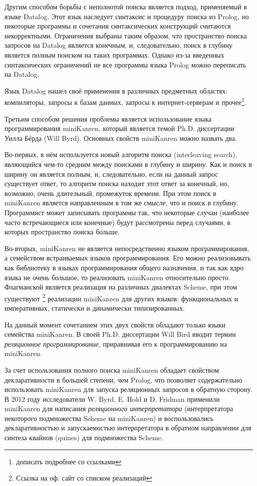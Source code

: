 Другим способом борьбы с неполнотой поиска является подход, применяемый в языке Datalog. Этот язык наследует синтаксис и процедуру поиска из Prolog, но некоторые программы и сочетания синтаксических конструкций считаются некорректными. Ограничения выбраны таким образом, что пространство поиска запросов на Datalog является конечным, и, следовательно, поиск в глубину является полным поиском на таких программах. Однако из-за введенных синтаксических ограничений не все программы языка Prolog можно переписать на Datalog.

Язык Datalog нашел своё применения в различных предметных областях: компиляторы, запросы к базам данных, запросы к интернет-серверам и прочее\footnote{дописать подробнее со ссылками}.

Третьим способом решения проблемы является использование языка программирования miniKanren, который является темой Ph.D. диссертации Уилла Бёрда (Will Byrd). Основных свойств miniKanren можно назвать два.

Во-первых, в нём используется новый алгоритм поиска (interleaving search), являющийся чем-то средним между поисками в глубину и ширину. Как и поиск в ширину он является полным, и, следовательно, если на данный запрос существует ответ, то алгоритм поиска находит этот ответ за конечный, но, возможно, очень длительный, промежуток времени. При этом поиск в miniKanren является направленным в том же смысле, что и поиск в глубину. Программист может записывать программы так, что некоторые случаи (наиболее часто встречающиеся или конечные) будут рассмотрены перед случаями, в которых пространство поиска больше.

Во-вторых, miniKanren не является непосредственно языком программирования, а семейством встраиваемых языков программирования. Его можно реализовывать как библиотеку в языках программирования общего назначения, и так как ядро языка не очень большое, то реализовать miniKanren относительно просто. Флагманской является реализация на различных диалектах Scheme, при этом существуют \footnote{Ссылка на оф. сайт со списком реализаций} реализации miniKanren для других языков: функциональных и императивных, статически и динамически типизированных.

На данный момент сочетанием этих двух свойств обладают только языки семейства miniKanren. В своей Ph.D. диссертации Will Bird вводит термин \emph{реляционное программирование}, приравнивая его к программированию на miniKanren.

За счет использования полного поиска miniKanren обладает свойством декларативности в большей степени, чем Prolog, что позволяет содержательно использовать miniKanren для запуска реляционных запросов в обратную сторону. В 2012 году исследователи W. Byrd, E. Hold и D. Fridman применили miniKanren для написания \emph{реляционного интерпретатора} (интерпретатора некоторого подмножества Scheme на miniKanren) и воспользовались декларативностью и запускаемостью интерпретатора в обратном направлении для синтеза квайнов (quines) для подмножества Scheme.

